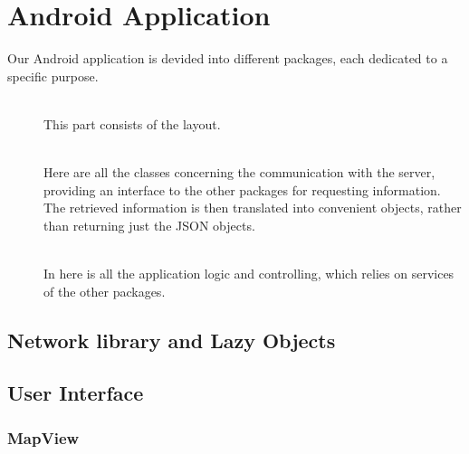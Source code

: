 \section{Android Application}
Our Android application is devided into different packages, each dedicated to a specific purpose.

\begin{description}
	\item[]\hfill\\This part consists of the layout.
	\item[]\hfill\\Here are all the classes concerning the communication with the server, providing an interface to the other packages for requesting information. The retrieved information is then translated into convenient objects, rather than returning just the JSON objects.
	\item[]\hfill\\In here is all the application logic and controlling, which relies on services of the other packages.
\end{description}

\subsection{Network library and Lazy Objects}

\subsection{User Interface}

\subsubsection{MapView}

